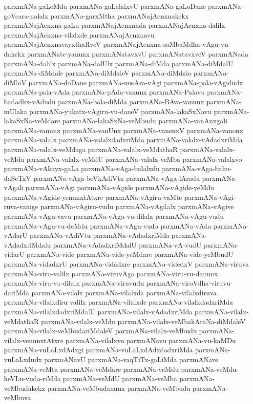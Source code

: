 {parxmANa-gaLeMdu
parxmANa-gaLelalxvU
parxmANa-gaLoDane
parxmANa-goVcara-nalalx
parxmANa-garxMtha
parxmANajAcnxnakekx
parxmANajAcnxna-gaLu
parxmANajAcnxnada
parxmANajAcnxna-dalilx
parxmANajAcnxna-vilalxde
parxmANajAcnxnavu
parxmANajAcnxnavayxthaRveV
parxmANajAcnxna-saMbaMdha-vAgu-vu-dakekx
parxmANate-yanunx
parxmANatavxvU
parxmANatavxveV
parxmANada
parxmANa-dalilx
parxmANa-dalUlx
parxmANa-diMda
parxmANa-diMdalU
parxmANa-diMdale
parxmANa-diMdaleV
parxmANa-diMdalo
parxmANa-diMloV
parxmANa-doDane
parxmANa-nusAra-vAgi
parxmANa-pala-vAgidudx
parxmANa-pala-vAda
parxmANa-pAda-vanunx
parxmANa-Palavu
parxmANa-badadhx-vAdudu
parxmANa-bala-diMda
parxmANa-BAva-vanunx
parxmANa-mUlaka
parxmANa-yukatx-vAgiru-vu-daneV
parxmANa-lakaSxNavu
parxmANa-lakaSxNa-veMdare
parxmANa-lakaSxNa-veMbudu
parxmANa-vanAnxgali
parxmANa-vanunx
parxmANa-vanUnx
parxmANa-vanenxV
parxmANa-vanonx
parxmANa-valalx
parxmANa-valalxdadxriMda
parxmANa-valalx-vAdadxriMda
parxmANa-valalx-veMdaga
parxmANa-valalx-veMdathaR
parxmANa-valalx-veMdu
parxmANa-valalx-veMdU
parxmANa-valalx-veMba
parxmANa-valalxvo
parxmANa-vAkayx-gaLa
parxmANa-vAga-balalxdu
parxmANa-vAga-bahu-daSeTxV
parxmANa-vAga-beVkAdiVtu
parxmANa-vAga-lAradu
parxmANa-vAgali
parxmANa-vAgi
parxmANa-vAgide
parxmANa-vAgide-yeMdu
parxmANa-vAgide-yenunxtAtxre
parxmANa-vAgiru-vaMte
parxmANa-vAgi-ruva-vanige
parxmANa-vAgiru-vudu
parxmANa-vAgilalx
parxmANa-vAgive
parxmANa-vAgu-vavu
parxmANa-vAgu-vu-dilalx
parxmANa-vAgu-vudu
parxmANa-vAgu-vu-deMdu
parxmANa-vAgu-vudo
parxmANa-vAda
parxmANa-vAdarU
parxmANa-vAdiVtu
parxmANa-vAdadxriMda
parxmANa-vAdadxriMdalu
parxmANa-vAdadxriMdalU
parxmANa-vA-vudU
parxmANa-vidarU
parxmANa-vide
parxmANa-vide-yeMdare
parxmANa-vide-yeMbudU
parxmANa-vidadxrU
parxmANa-vidadxre
parxmANa-videdxV
parxmANa-viruva
parxmANa-viru-valilx
parxmANa-viruvAga
parxmANa-viru-vu-danunx
parxmANa-viru-vu-dilalx
parxmANa-viruvudu
parxmANa-viroVdha-viruvu-dariMda
parxmANa-vilalx
parxmANa-vilalxda
parxmANa-vilalxdiruva
parxmANa-vilalxdiru-valilx
parxmANa-vilalxde
parxmANa-vilalxdadxriMda
parxmANa-vilalxdadxriMdalU
parxmANa-vilalx-vAdadxriMda
parxmANa-vilalx-veMdathaR
parxmANa-vilalx-veMdu
parxmANa-vilalx-veMbakAraNa-diMdaleV
parxmANa-vilalx-veMbudariMdaleV
parxmANa-vilalx-veMbudu
parxmANa-vilalx-venunxtAtxre
parxmANa-vilalxvo
parxmANavu
parxmANa-vu-kaMDu
parxmANa-vuLaLxdAdxgi
parxmANa-vuLaLxdAdxdadxriMda
parxmANa-vuLaLxdudx
parxmANavU
parxmANa-vaqTiTx-gaLiMda
parxmANave
parxmANa-veMta
parxmANa-veMdare
parxmANa-veMdu
parxmANa-veMdu-heVLu-vuda-riMda
parxmANa-veMdU
parxmANa-veMba
parxmANa-veMbudakekx
parxmANa-veMbudanunx
parxmANa-veMbudu
parxmANa-veMbuva
}
